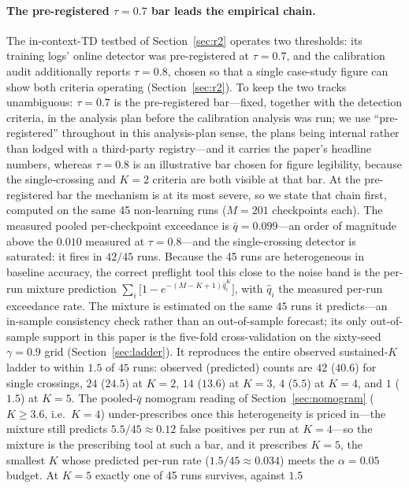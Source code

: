 \documentclass[11pt]{article}
\theoremstyle{plain}
\theoremstyle{definition}
\begin{document}
\paragraph{The pre-registered $\tau=0.7$ bar leads the empirical chain.}
The in-context-TD testbed of Section~\ref{sec:r2} operates two thresholds: its training
logs' online detector was pre-registered at $\tau=0.7$, and the calibration audit
additionally reports $\tau=0.8$, chosen so that a single case-study figure can show both
criteria operating (Section~\ref{sec:r2}). To keep the two tracks unambiguous:
$\tau=0.7$ is the pre-registered bar---fixed, together with the detection criteria, in
the analysis plan before the calibration analysis was run; we use ``pre-registered''
throughout in this analysis-plan sense, the plans being internal rather than lodged with
a third-party registry---and it carries the paper's headline numbers, whereas $\tau=0.8$
is an illustrative bar chosen for figure legibility, because the single-crossing and $K=2$
criteria are both visible at that bar. At the pre-registered bar the mechanism is at
its most severe, so we state that chain first, computed on the same 45 non-learning runs
($M=201$ checkpoints each). The measured pooled per-checkpoint exceedance is
$\bar q=0.099$---an order of magnitude above the $0.010$ measured at $\tau=0.8$---and the
single-crossing detector is saturated: it fires in $42/45$ runs. Because the 45 runs are
heterogeneous in baseline accuracy, the correct preflight tool this close to the noise
band is the per-run mixture prediction $\sum_i\bigl[1-e^{-(M-K+1)\hat q_i^{K}}\bigr]$,
with $\hat q_i$ the measured per-run exceedance rate. The mixture is estimated on the
same $45$ runs it predicts---an in-sample consistency check rather than an out-of-sample
forecast; its only out-of-sample support in this paper is the five-fold cross-validation
on the sixty-seed $\gamma=0.9$ grid (Section~\ref{sec:ladder}). It reproduces the entire observed
sustained-$K$ ladder to within $1.5$ of $45$ runs: observed (predicted) counts are $42$
($40.6$) for single crossings, $24$ ($24.5$) at $K{=}2$, $14$ ($13.6$) at $K{=}3$, $4$
($5.5$) at $K{=}4$, and $1$ ($1.5$) at $K{=}5$. The pooled-$\bar q$ nomogram reading of
Section~\ref{sec:nomogram} ($K\geq3.6$, i.e.\ $K=4$) under-prescribes once this
heterogeneity is priced in---the mixture still predicts $5.5/45\approx0.12$ false
positives per run at $K{=}4$---so the mixture is the prescribing tool at such a bar, and
it prescribes $K=5$, the smallest $K$ whose predicted per-run rate ($1.5/45\approx0.034$)
meets the $\alpha=0.05$ budget. At $K=5$ exactly one of 45 runs survives, against $1.5$
\end{document}
